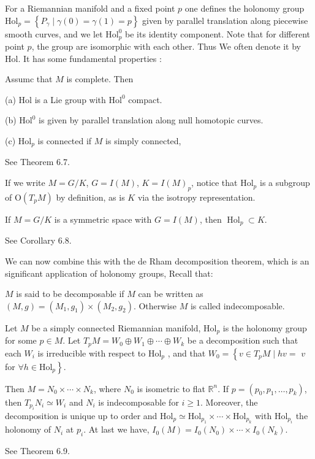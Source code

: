For a Riemannian manifold and a fixed point $p$ one defines the
holonomy group $\mathrm{Hol}_{p} = \left\{P_{\gamma} \mid
\gamma(0) = \gamma(1) = p\right\}$ given by parallel translation
along piecewise smooth curves, and we let $\mathrm{Hol}_{p}^{0}$
be its identity component. Note that for different point $p$, the
group are isomorphic with each other. Thus We  often denote it by
Hol. It has some fundamental properties :
\begin{theorem}
	Assumc that $M$ is complete. Then
	
	(a) $\mathrm{Hol}$ is a Lie group with  $\mathrm{Hol}^{0}$
	compact.
	
	(b) $\mathrm{Hol}^0$ is given by parallel translation along
	null homotopic curves.
	
	(c) $\mathrm{Hol}_{p}$ is connected if $M$ is simply
	connected,
\end{theorem}
\bproof
See \cite{Ziller} Theorem 6.7.
\eproof

If we write $M = G / K$, $G = I(M)$, $K = I(M)_p$,  notice that
$\mathrm{Hol}_{p}$ is a subgroup of $\mathrm{O}\left(T_{p}
M\right)$ by definition, as is $K$ via the isotropy
representation.

\begin{corollary}
	If $M = G / K$ is a symmetric space with $G = {I}(M)$, then
	$\operatorname{Hol}_{p} \subset K$.
\end{corollary}
\bproof
See \cite{Ziller} Corollary 6.8.
\eproof


We can now combine this  with the de Rham decomposition theorem,
which is an significant application of holonomy groups, 
Recall that:
\begin{definition}
	$M$ is said to be decomposable if $M$ can be written as
	$(M,g) = (M_1,g_1)\times(M_2,g_2)$. Otherwise $M$ is called
	indecomposable.
\end{definition}
\begin{theorem}[de Rham]
	 Let $M$ be a simply connected Riemannian manifold,
	 $\mathrm{Hol}_{p}$ is the holonomy group for some $p\in M$.
	 Let $T_{p} M = W_{0} \oplus W_{1} \oplus \cdots \oplus
	 W_{k}$ be a decomposition such that each $W_i$ is
	 irreducible with respect to $\mathrm{Hol}_{p}$ , and that 
	 $W_{0} = \left\{ v \in T_{p} M \mid h v = \right.$ $v$ for
	 $\forall \left.h \in \mathrm{Hol}_{p} \right\}$. 
	 
	 Then $M = N_{0} \times \cdots \times N_{k}$, where $N_{0}$
	 is isometric to flat $\mathbb{R}^{n}$. If $p = \left(p_{0},
	 p_{1}, \ldots, p_{k} \right)$, then $T_{p_{i}} N_{i} \simeq
	 W_{i}$ and $N_{i}$ is indecomposable for $i \geq 1$.
	 Moreover, the decomposition is unique up to order and
	 $\mathrm{Hol}_{p} \simeq \mathrm{Hol}_{p_{1}} \times \cdots
	 \times \mathrm{Hol}_{p_{k}}$ with $\mathrm{Hol}_{p_{i}}$ the holonomy
	of $N_{i}$ at $p_{i} .$ At last we have, ${I}_{0}(M) = {I}_{0}\left(N_{0}\right) \times \cdots \times {I}_{0}\left(N_{k}\right)$.
\end{theorem}
\bproof
See \cite{Ziller} Theorem 6.9.
\eproof

